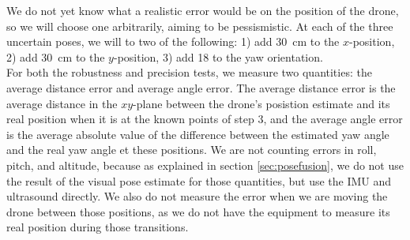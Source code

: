 We do not yet know what a realistic error would be on the position of the drone, so we will choose one arbitrarily, aiming to be pessismistic. At each of the three uncertain poses, we will to two of the following: 1) add \SI{30}{\centi\meter} to the $x$-position, 2) add \SI{30}{\centi\meter} to the $y$-position, 3) add \num{18}{\degree} to the yaw orientation.\\
For both the robustness and precision tests, we measure two quantities: the average distance error and average angle error. The average distance error is the average distance in the $xy$-plane between the drone's posistion estimate and its real position when it is at the known points of step 3, and the average angle error is the average absolute value of the difference between the estimated yaw angle and the real yaw angle et these positions. We are not counting errors in roll, pitch, and altitude, because as explained in section \ref{sec:posefusion}, we do not use the result of the visual pose estimate for those quantities, but use the IMU and ultrasound directly. We also do not measure the error when we are moving the drone between those positions, as we do not have the equipment to measure its real position during those transitions.
